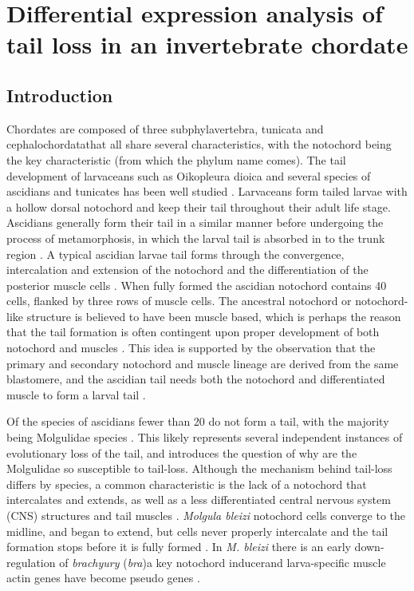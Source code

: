 \chapter{Differential expression analysis of tail loss in an invertebrate chordate}

\section{Introduction}

Chordates are composed of three subphyla\textemdash vertebra, tunicata and cephalochordata\textemdash that all share several characteristics, with the notochord being the key characteristic (from which the phylum name comes). The tail development of larvaceans such as Oikopleura dioica and several species of ascidians and tunicates has been well studied \cite{jeffery_factors_1992,nakatani_mutations_1999,kugler_evolutionary_2011}. Larvaceans form tailed larvae with a hollow dorsal notochord and keep their tail throughout their adult life stage. Ascidians generally form their tail in a similar manner before undergoing the process of metamorphosis, in which the larval tail is absorbed in to the trunk region \cite{paris_history_2008}. A typical ascidian larvae tail forms through the convergence, intercalation and extension of the notochord and the differentiation of the posterior muscle cells \cite{swalla_mechanisms_1993}. When fully formed the ascidian notochord contains 40 cells, flanked by three rows of muscle cells. The ancestral notochord or notochord-like structure is believed to have been muscle based, which is perhaps the reason that the tail formation is often contingent upon proper development of both notochord and muscles \cite{lauri_development_2014}. This idea is supported by the observation that the primary and secondary notochord and muscle lineage are derived from the same blastomere, and the ascidian tail needs both the notochord and differentiated muscle to form a larval tail \cite{nishida_cell_1987,di_gregorio_tail_2002}.

Of the  species of ascidians fewer than 20 do not form a tail, with the majority being Molgulidae species \cite{berrill_studies_1931,huber_evolution_2000}. This likely represents several independent instances of evolutionary loss of the tail, and introduces the question of why are the Molgulidae so susceptible to tail-loss. Although the mechanism behind tail-loss differs by species, a common characteristic is the lack of a notochord that intercalates and extends, as well as a less differentiated central nervous system (CNS) structures and tail muscles \cite{swalla_mechanisms_1993}. \textit{Molgula bleizi} notochord cells converge to the midline, and began to extend, but cells never properly intercalate and the tail formation stops before it is fully formed \cite{jeffery_evolution_1999}. In \textit{M. bleizi} there is an early down-regulation of \textit{brachyury} (\textit{bra})\textemdash a key notochord inducer\textemdash and larva-specific muscle actin genes have become pseudo genes \cite{jeffery_evolution_1999}.   

